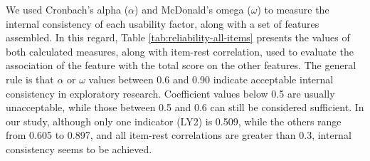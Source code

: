 \documentclass[preprint,12pt]{elsarticle}
\begin{document}
We used Cronbach's alpha ($\alpha$) and McDonald's omega ($\omega$) to measure the internal consistency of each usability factor, along with a set of features assembled. In this regard, Table \ref{tab:reliability-all-items} presents the values of both calculated measures, along with item-rest correlation, used to evaluate the association of the feature with the total score on the other features. 
The general rule is that $\alpha$ or $\omega$ values between 0.6 and 0.90 indicate acceptable internal consistency in exploratory research. Coefficient values below 0.5 are usually unacceptable, while those between 0.5 and 0.6 can still be considered sufficient. In our study, although only one indicator (LY2) is 0.509, while the others range from 0.605 to 0.897, and all item-rest correlations are greater than 0.3, internal consistency seems to be achieved. 
\end{document}
